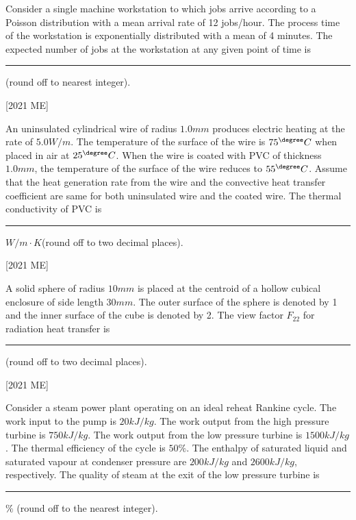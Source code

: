 \iffalse
\title{2021-ME-53-65}
\author{EE24BTECH11010 - Balaji B}
\section{ee}
\chapter{2021}
\fi

\item Consider a single machine workstation to which jobs arrive according to a
Poisson distribution with a mean arrival rate of 12 jobs/hour. The process
time of the workstation is exponentially distributed with a mean of 4
minutes. The expected number of jobs at the workstation at any given
point of time is \rule{2cm}{0.4pt} (round off to nearest integer).

\hfill [2021 ME]
    \item An uninsulated cylindrical wire of radius $1.0 mm$ produces electric heating
at the rate of $5.0 W/m$. The temperature of the surface of the wire is $75 ^{\degree} C$
when placed in air at $25 ^{\degree} C$. When the wire is coated with PVC of thickness
$1.0 mm$, the temperature of the surface of the wire reduces to $55 ^{\degree} C$.
Assume that the heat generation rate from the wire and the convective heat
transfer coefficient are same for both uninsulated wire and the coated wire.
The thermal conductivity of PVC is \rule{2cm}{0.4pt} $W/m\cdot K$(round off to two decimal places). 

\hfill [2021 ME]
\item A solid sphere of radius $10 mm$ is placed at the centroid of a hollow cubical
enclosure of side length $30 mm$. The outer surface of the sphere is denoted
by 1 and the inner surface of the cube is denoted by 2. The view factor $F_{22}$
for radiation heat transfer is \rule{2cm}{0.4pt} (round off to two decimal places).

\hfill [2021 ME]
\item Consider a steam power plant operating on an ideal reheat Rankine cycle.
The work input to the pump is $20 kJ/kg$. The work output from the high
pressure turbine is $750 kJ/kg$. The work output from the low pressure
turbine is $1500 kJ/kg$. The thermal efficiency of the cycle is $50 \% $. The
enthalpy of saturated liquid and saturated vapour at condenser pressure
are $200 kJ/kg$ and $2600 kJ/kg$, respectively. The quality of steam at the exit
of the low pressure turbine is \rule{2cm}{0.4pt} $\%$ (round off to the nearest integer). 

